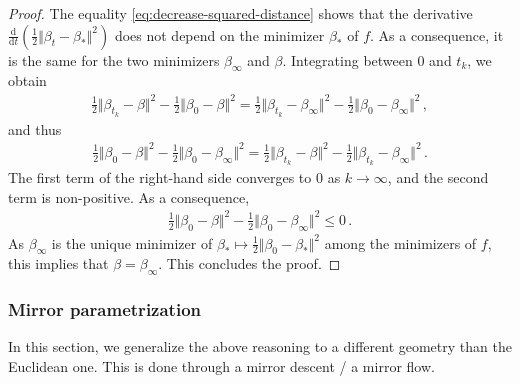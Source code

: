\documentclass[11pt,reqno]{article}
\newcommand{\diff}{\mathrm{d}}
\renewcommand{\leq}{\leqslant}
\numberwithin{equation}{section}
\theoremstyle{plain}
\theoremstyle{definition}
\theoremstyle{remark}
\begin{document}
\begin{proof}
	The equality \eqref{eq:decrease-squared-distance} shows that the derivative $\frac{\diff }{\diff t} \left(\frac{1}{2 } \Vert \beta_t - \beta_* \Vert^2\right)$ does not depend on the minimizer $\beta_*$ of $f$. As a consequence, it is the same for the two minimizers $\beta_\infty$ and $\beta$. Integrating between $0$ and $t_k$, we obtain 
	\begin{align*}
		\frac{1}{2} \Vert \beta_{t_k} - \beta \Vert^2 - \frac{1}{2} \Vert \beta_0 - \beta \Vert^2 = \frac{1}{2} \Vert \beta_{t_k} - \beta_\infty \Vert^2 - \frac{1}{2} \Vert \beta_0 - \beta_\infty \Vert^2 \, ,
	\end{align*}
	and thus 
	\begin{align*}
		\frac{1}{2} \Vert \beta_0 - \beta \Vert^2 - \frac{1}{2} \Vert \beta_0 - \beta_\infty \Vert^2 = \frac{1}{2} \Vert \beta_{t_k} - \beta \Vert^2 - \frac{1}{2} \Vert \beta_{t_k} - \beta_\infty \Vert^2 \, .
	\end{align*}
	The first term of the right-hand side converges to $0$ as $k \to \infty$, and the second term is non-positive. As a consequence, 
	\begin{align*}
		\frac{1}{2} \Vert \beta_0 - \beta \Vert^2 - \frac{1}{2} \Vert \beta_0 - \beta_\infty \Vert^2 \leq 0 \, . 
	\end{align*}
	As $\beta_\infty$ is the unique minimizer of $\beta_* \mapsto \frac{1}{2} \Vert \beta_0 - \beta_* \Vert^2$ among the minimizers of $f$, this implies that $\beta = \beta_\infty$. This concludes the proof.
\end{proof}

\subsubsection{Mirror parametrization}

In this section, we generalize the above reasoning to a different geometry than the Euclidean one. This is done through a mirror descent / a mirror flow. 
\end{document}
